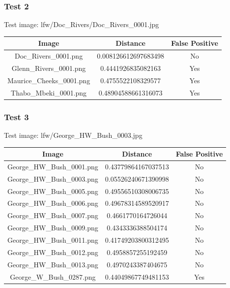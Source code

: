 \documentclass[12pt]{article}
\begin{document}
\subsubsection{Test 2}
Test image: lfw/Doc\_Rivers/Doc\_Rivers\_0001.jpg

\begin{center}
\begin{tabular}{ccc}
Image & Distance & False Positive \\
\hline
Doc\_Rivers\_0001.png & 0.008126612697683498 & No \\
Glenn\_Rivers\_0001.png & 0.4441926835082163 & Yes \\
Maurice\_Cheeks\_0001.png & 0.4755522108329577 & Yes \\
Thabo\_Mbeki\_0001.png & 0.48904588661316073 & Yes \\
\end{tabular}
\end{center}

\subsubsection{Test 3}
Test image: lfw/George\_HW\_Bush\_0003.jpg

\begin{center}
\begin{tabular}{ccc}
Image & Distance & False Positive \\
\hline
George\_HW\_Bush\_0001.png & 0.43779864167037513 & No \\
George\_HW\_Bush\_0003.png & 0.05526240671390998 & No \\
George\_HW\_Bush\_0005.png & 0.49556510308006735 & No \\
George\_HW\_Bush\_0006.png & 0.49678314589520917 & No \\
George\_HW\_Bush\_0007.png & 0.4661770164726044 & No \\
George\_HW\_Bush\_0009.png & 0.4343336388504174 & No \\
George\_HW\_Bush\_0011.png & 0.41749203800312495 & No \\
George\_HW\_Bush\_0012.png & 0.4958857255192459 & No \\
George\_HW\_Bush\_0013.png & 0.4970243387404675 & No \\
George\_W\_Bush\_0287.png & 0.44049867749481153 & Yes \\

\end{tabular}
\end{center}
\end{document}

